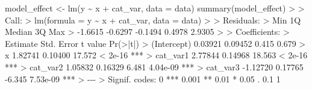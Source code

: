 \documentclass[
  letterpaper,
]{book}
\newenvironment{Shaded}{\begin{snugshade}}{\end{snugshade}}
\newcommand{\AttributeTok}[1]{\textcolor[rgb]{0.40,0.45,0.13}{#1}}
\newcommand{\DecValTok}[1]{\textcolor[rgb]{0.68,0.00,0.00}{#1}}
\newcommand{\ErrorTok}[1]{\textcolor[rgb]{0.68,0.00,0.00}{#1}}
\newcommand{\FloatTok}[1]{\textcolor[rgb]{0.68,0.00,0.00}{#1}}
\newcommand{\FunctionTok}[1]{\textcolor[rgb]{0.28,0.35,0.67}{#1}}
\newcommand{\NormalTok}[1]{\textcolor[rgb]{0.00,0.23,0.31}{#1}}
\newcommand{\OtherTok}[1]{\textcolor[rgb]{0.00,0.23,0.31}{#1}}
\newcommand{\SpecialCharTok}[1]{\textcolor[rgb]{0.37,0.37,0.37}{#1}}
\newcommand{\StringTok}[1]{\textcolor[rgb]{0.13,0.47,0.30}{#1}}
\begin{document}
\begin{Shaded}
\begin{Highlighting}[]
\NormalTok{model\_effect }\OtherTok{\textless{}{-}} \FunctionTok{lm}\NormalTok{(y }\SpecialCharTok{\textasciitilde{}}\NormalTok{ x }\SpecialCharTok{+}\NormalTok{ cat\_var, }\AttributeTok{data =}\NormalTok{ data)}
\FunctionTok{summary}\NormalTok{(model\_effect)}
\SpecialCharTok{\textgreater{}} 
\ErrorTok{\textgreater{}}\NormalTok{ Call}\SpecialCharTok{:}
\ErrorTok{\textgreater{}} \FunctionTok{lm}\NormalTok{(}\AttributeTok{formula =}\NormalTok{ y }\SpecialCharTok{\textasciitilde{}}\NormalTok{ x }\SpecialCharTok{+}\NormalTok{ cat\_var, }\AttributeTok{data =}\NormalTok{ data)}
\SpecialCharTok{\textgreater{}} 
\ErrorTok{\textgreater{}}\NormalTok{ Residuals}\SpecialCharTok{:}
\ErrorTok{\textgreater{}}\NormalTok{     Min      }\DecValTok{1}\NormalTok{Q  Median      }\DecValTok{3}\NormalTok{Q     Max }
\SpecialCharTok{\textgreater{}} \SpecialCharTok{{-}}\FloatTok{1.6615} \SpecialCharTok{{-}}\FloatTok{0.6297} \SpecialCharTok{{-}}\FloatTok{0.1494}  \FloatTok{0.4978}  \FloatTok{2.9305} 
\SpecialCharTok{\textgreater{}} 
\ErrorTok{\textgreater{}}\NormalTok{ Coefficients}\SpecialCharTok{:}
\ErrorTok{\textgreater{}}\NormalTok{             Estimate Std. Error t value }\FunctionTok{Pr}\NormalTok{(}\SpecialCharTok{\textgreater{}}\ErrorTok{|}\NormalTok{t}\SpecialCharTok{|}\NormalTok{)    }
\SpecialCharTok{\textgreater{}}\NormalTok{ (Intercept)  }\FloatTok{0.03921}    \FloatTok{0.09452}   \FloatTok{0.415}    \FloatTok{0.679}    
\SpecialCharTok{\textgreater{}}\NormalTok{ x            }\FloatTok{1.82741}    \FloatTok{0.10400}  \FloatTok{17.572}  \SpecialCharTok{\textless{}} \FloatTok{2e{-}16} \SpecialCharTok{**}\ErrorTok{*}
\ErrorTok{\textgreater{}}\NormalTok{ cat\_var1     }\FloatTok{2.77844}    \FloatTok{0.14968}  \FloatTok{18.563}  \SpecialCharTok{\textless{}} \FloatTok{2e{-}16} \SpecialCharTok{**}\ErrorTok{*}
\ErrorTok{\textgreater{}}\NormalTok{ cat\_var2     }\FloatTok{1.05832}    \FloatTok{0.16329}   \FloatTok{6.481} \FloatTok{4.04e{-}09} \SpecialCharTok{**}\ErrorTok{*}
\ErrorTok{\textgreater{}}\NormalTok{ cat\_var3    }\SpecialCharTok{{-}}\FloatTok{1.12720}    \FloatTok{0.17765}  \SpecialCharTok{{-}}\FloatTok{6.345} \FloatTok{7.53e{-}09} \SpecialCharTok{**}\ErrorTok{*}
\ErrorTok{\textgreater{}} \SpecialCharTok{{-}{-}{-}}
\ErrorTok{\textgreater{}}\NormalTok{ Signif. codes}\SpecialCharTok{:}  \DecValTok{0} \StringTok{\textquotesingle{}***\textquotesingle{}} \FloatTok{0.001} \StringTok{\textquotesingle{}**\textquotesingle{}} \FloatTok{0.01} \StringTok{\textquotesingle{}*\textquotesingle{}} \FloatTok{0.05} \StringTok{\textquotesingle{}.\textquotesingle{}} \FloatTok{0.1} \StringTok{\textquotesingle{} \textquotesingle{}} \DecValTok{1}

\end{Highlighting}
\end{Shaded}
\end{document}
